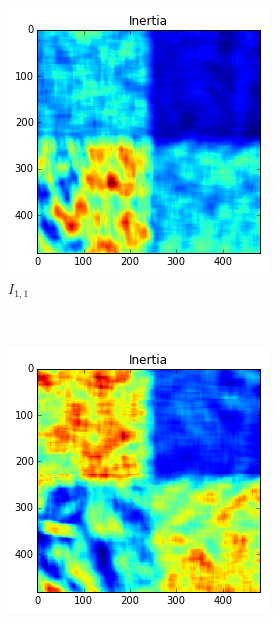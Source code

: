 \documentclass[a4paper]{article}
\begin{document}
\begin{figure}
    \centering
    \begin{subfigure}[b]{0.30\textwidth}
        \centering
        \includegraphics[width=\textwidth]{inertia11.png}
        \caption{%
            $I_{1,1}$
        }
        \label{fig:i11}
    \end{subfigure}
    ~
    \begin{subfigure}[b]{0.30\textwidth}
        \centering
        \includegraphics[width=\textwidth]{inertia21.png}

\end{subfigure}
\end{figure}
\end{document}
